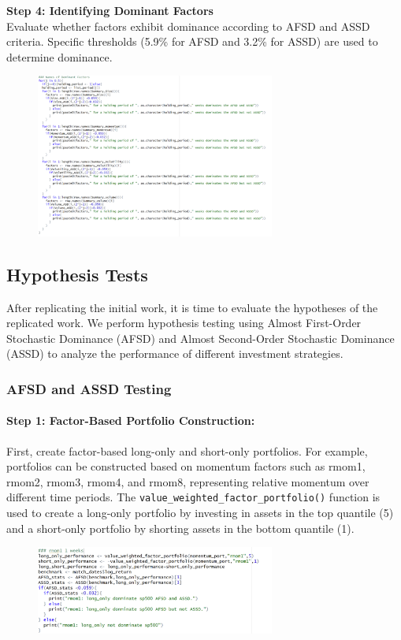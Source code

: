 \documentclass{article}
\begin{document}
\textbf{Step 4: Identifying Dominant Factors}\\
Evaluate whether factors exhibit dominance according to AFSD and ASSD criteria. Specific thresholds (5.9\% for AFSD and 3.2\% for ASSD) are used to determine dominance.
\begin{figure}[H]
    \centering
    \includegraphics[width=0.7\textwidth]{16.png}
    \label{fig:example}
\end{figure}

\hypertarget{hypothesis-tests}{%
\subsection{Hypothesis Tests}\label{hypothesis-tests}}

After replicating the initial work, it is time to evaluate the hypotheses of the replicated work. We perform hypothesis testing using Almost First-Order Stochastic Dominance (AFSD) and Almost Second-Order Stochastic Dominance (ASSD) to analyze the performance of different investment strategies.

\subsubsection{AFSD and ASSD Testing}

\paragraph{Step 1: Factor-Based Portfolio Construction:}
First, create factor-based long-only and short-only portfolios. For example, portfolios can be constructed based on momentum factors such as rmom1, rmom2, rmom3, rmom4, and rmom8, representing relative momentum over different time periods. The \texttt{value\_weighted\_factor\_portfolio()} function is used to create a long-only portfolio by investing in assets in the top quantile (5) and a short-only portfolio by shorting assets in the bottom quantile (1).
\begin{figure}[H]
    \centering
    \includegraphics[width=0.7\textwidth]{17.png}
    \label{fig:example}
\end{figure}
\end{document}
